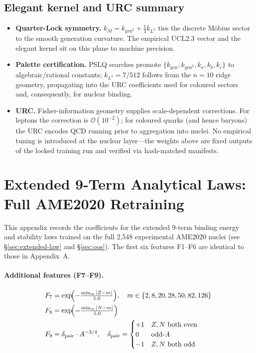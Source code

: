 \documentclass[9pt,twocolumn]{extarticle}
\begin{document}
\subsection{Elegant kernel and URC summary}
\begin{itemize}[leftmargin=1.2em,itemsep=0.2em]
  \item \textbf{Quarter-Lock symmetry.} $k_M = k_{\text{gen}^2} + \tfrac14 k_{L^2}$ ties the discrete Möbius sector to the smooth generation curvature. The empirical UCL2.3 vector and the elegant kernel sit on this plane to machine precision.
  \item \textbf{Palette certification.} PSLQ searches promote $\{k_{\text{gen}},k_{\text{gen}^2},k_a,k_b,k_c\}$ to algebraic/rational constants; $k_{L^2}=7/512$ follows from the $n=10$ ridge geometry, propagating into the URC coefficients used for coloured sectors and, consequently, for nuclear binding.
  \item \textbf{URC.} Fisher-information geometry supplies scale-dependent corrections. For leptons the correction is $\mathcal{O}(10^{-2})$; for coloured quarks (and hence baryons) the URC encodes QCD running prior to aggregation into nuclei. No empirical tuning is introduced at the nuclear layer—the weights above are fixed outputs of the locked training run and verified via hash-matched manifests.
\end{itemize}




\section{Extended 9-Term Analytical Laws: Full AME2020 Retraining}
\label{app:extended-law}

This appendix records the coefficients for the extended 9-term binding energy and stability laws trained on the full 2,548 experimental AME2020 nuclei (see \S\ref{sec:extended-law} and \S\ref{sec:oos}).  The first six features F1--F6 are identical to those in Appendix~A.

\paragraph{Additional features (F7--F9).}
\begin{align}
F_7 &= \exp\!\Bigl(-\tfrac{\min_m |Z - m|}{5.0}\Bigr), \quad m \in \{2,8,20,28,50,82,126\}\\
F_8 &= \exp\!\Bigl(-\tfrac{\min_m |N - m|}{5.0}\Bigr)\\
F_9 &= \delta_{\mathrm{pair}} \cdot A^{-3/4}, \quad
       \delta_{\mathrm{pair}} = \begin{cases}+1 & Z,N\ \text{both even}\\0 & \text{odd-}A\\ -1 & Z,N\ \text{both odd}\end{cases}
\end{align}
\end{document}
